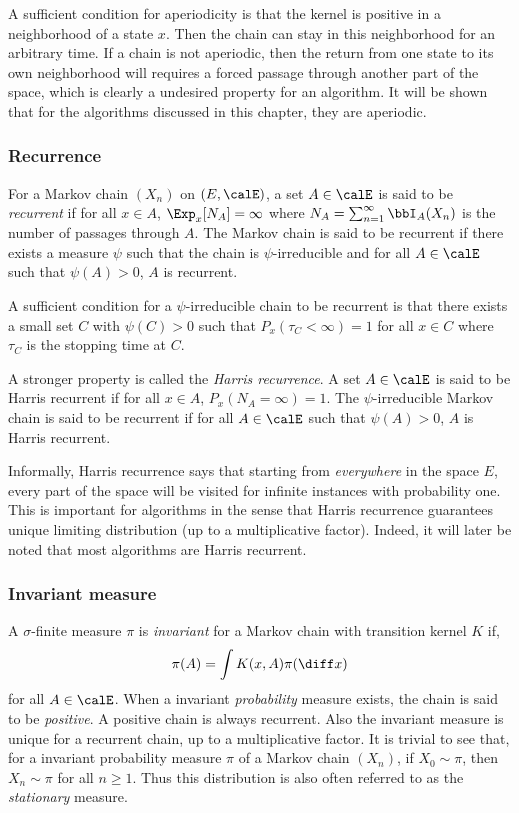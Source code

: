 A sufficient condition for aperiodicity is that the kernel is positive in a
neighborhood of a state $x$. Then the chain can stay in this neighborhood for
an arbitrary time. If a chain is not aperiodic, then the return from one state
to its own neighborhood will requires a forced passage through another part of
the space, which is clearly a undesired property for an \mcmc algorithm. It
will be shown that for the algorithms discussed in this chapter, they are
aperiodic.

\subsubsection{Recurrence}

For a Markov chain $(X_n)$ on $(E,\calE)$, a set $A\in\calE$ is said to be
\emph{recurrent} if for all $x\in A$, $\Exp_x[N_A] = \infty$ where $N_A =
\sum_{n=1}^{\infty}\bbI_A(X_n)$ is the number of passages through $A$. The
Markov chain is said to be recurrent if there exists a measure $\psi$ such
that the chain is $\psi$-irreducible and for all $A\in\calE$ such that
$\psi(A)>0$, $A$ is recurrent.

A sufficient condition for a $\psi$-irreducible chain to be recurrent is that
there exists a small set $C$ with $\psi(C)>0$ such that $P_x(\tau_C<\infty) =
1$ for all $x\in C$ where $\tau_C$ is the stopping time at $C$.

A stronger property is called the \emph{Harris recurrence}. A set $A\in\calE$
is said to be Harris recurrent if for all $x\in A$, $P_x(N_A = \infty) = 1$.
The $\psi$-irreducible Markov chain is said to be recurrent if for all
$A\in\calE$ such that $\psi(A)>0$, $A$ is Harris recurrent.

Informally, Harris recurrence says that starting from \emph{everywhere} in the
space $E$, every part of the space will be visited for infinite instances with
probability one. This is important for \mcmc algorithms in the sense that
Harris recurrence guarantees unique limiting distribution (up to a
multiplicative factor). Indeed, it will later be noted that most algorithms
are Harris recurrent.

\subsubsection{Invariant measure}

A $\sigma$-finite measure $\pi$ is \emph{invariant} for a Markov chain with
transition kernel $K$ if,
\begin{equation}
  \pi(A) = \int K(x,A)\pi(\diff x)
\end{equation}
for all $A\in\calE$. When a invariant \emph{probability} measure exists, the
chain is said to be \emph{positive}. A positive chain is always
recurrent. Also the invariant measure is unique for a recurrent chain, up to a
multiplicative factor. It is trivial to see that, for a invariant probability
measure $\pi$ of a Markov chain $(X_n)$, if $X_0\sim\pi$, then $X_n\sim\pi$
for all $n\ge1$. Thus this distribution is also often referred to as the
\emph{stationary} measure.


